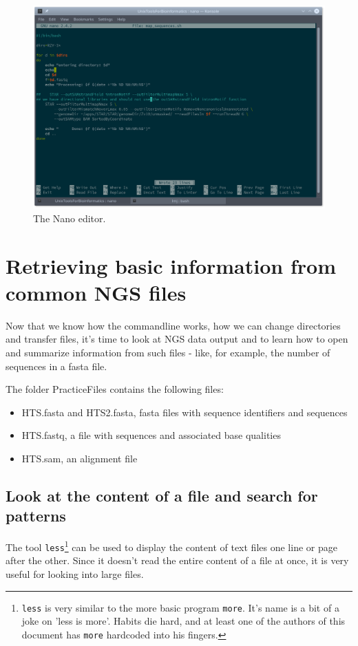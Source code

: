 \documentclass[11pt]{article}
\begin{document}
\begin{figure}[htb]
\centering
\includegraphics[width=.9\linewidth]{nanoShell.png}
\caption{\label{fig:nano}The Nano editor.}
\end{figure}

\section{Retrieving basic information from common NGS files}
\label{sec-4}

Now that we know how the commandline works, how we can change
directories and transfer files, it's time to look at NGS data output
and to learn how to open and summarize information from such files -
like, for example, the number of sequences in a fasta file.

The folder PracticeFiles contains the following files:
\begin{itemize}
\item HTS.fasta and HTS2.fasta, fasta files with sequence identifiers and sequences
\item HTS.fastq, a file with sequences and associated base qualities
\item HTS.sam, an alignment file
\end{itemize}

\subsection{Look at the content of a file and search for patterns}
\label{sec-4-1}
The tool \texttt{less}\footnote{\texttt{less} is very similar to the more basic program \texttt{more}. It's
name is a bit of a joke on 'less is more'. Habits die hard, and at
least one of the authors of this document has \texttt{more} hardcoded into
his fingers.} can be used to display the content of text
files one line or page after the other. Since it doesn't read the
entire content of a file at once, it is very useful for looking into
large files.
\end{document}
